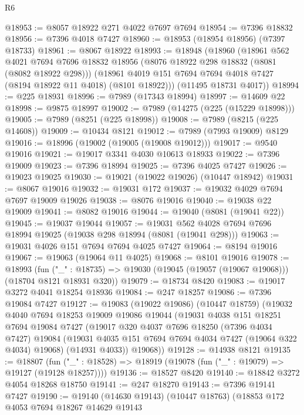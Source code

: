 \begin{lexlean}{R6}
\begin{coremodule}
@18953 := @8057 @18922 @271 @4022 @7697 @7694
@18954 := @7396 @18832
@18956 := @7396 @4018 @7427
@18960 := @18953 (@18954 @18956) (@7397 @18733)
@18961 := @8067 @18922
@18993 := @18948
    (@18960
      (@18961
        @562
        @4021
        @7694
        @7696
        @18832
        @18956
        (@8076 @18922 @298 @18832 (@8081 (@8082 @18922 @298)))
        (@18961 @4019 @151 @7694 @7694 @4018 @7427 (@8194 @18922 @11 @4018) (@8101 @18922)))
      (@11495 @18731 @4017))
@18994 := @225 @18931
@18996 := @7989 (@17343 @18994)
@18997 := @14609 @22
@18998 := @9875 @18997
@19002 := @7989 (@14275 (@225 (@15229 @18998)))
@19005 := @7989 (@8251 (@225 @18998))
@19008 := @7989 (@8215 (@225 @14608))
@19009 := @10434 @8121
@19012 := @7989 (@7993 @19009) @8129
@19016 := @18996 (@19002 (@19005 (@19008 @19012)))
@19017 := @9540 @19016
@19021 := @19017 @3341 @4030 @10613 @18933
@19022 := @7396 @19009
@19023 := @7396 @18994
@19025 := @7396 @4025 @7427
@19026 := @19023 @19025
@19030 := @19021 (@19022 @19026) (@10447 @18942)
@19031 := @8067 @19016
@19032 := @19031 @172
@19037 := @19032 @4029 @7694 @7697 @19009 @19026
@19038 := @8076 @19016
@19040 := @19038 @22 @19009
@19041 := @8082 @19016
@19044 := @19040 (@8081 (@19041 @22))
@19045 := @19037 @19044
@19057 := @19031 @562 @4028 @7694 @7696 @18994 @19025 (@19038 @298 @18994 (@8081 (@19041 @298)))
@19063 := @19031 @4026 @151 @7694 @7694 @4025 @7427
@19064 := @8194 @19016
@19067 := @19063 (@19064 @11 @4025)
@19068 := @8101 @19016
@19078 := @18993
    (fun ("_" : @18735) => @19030 (@19045 (@19057 (@19067 @19068))) (@18704 @8121 @18931 @320))
@19079 := @18734 @8420
@19083 := @19017 @3272 @4041 @18254 @18936
@19084 := @247 @18257
@19086 := @7396 @19084 @7427
@19127 := @19083
    (@19022 @19086)
    (@10447 @18759)
    (@19032
      @4040
      @7694
      @18253
      @19009
      @19086
      @19044
      (@19031
        @4038
        @151
        @18251
        @7694
        @19084
        @7427
        (@19017
          @320
          @4037
          @7696
          @18250
          (@7396 @4034 @7427)
          @19084
          (@19031 @4035 @151 @7694 @7694 @4034 @7427 (@19064 @322 @4034) @19068)
          (@14931 @4033))
        @19068))
@19128 := @14938 @8121
@19135 := @18807
    (fun ("_" : @18528) => @18919 (@19078 (fun ("_" : @19079) => @19127 (@19128 @18257))))
@19136 := @18527 @8420
@19140 := @18842 @3272 @4054 @18268 @18750
@19141 := @247 @18270
@19143 := @7396 @19141 @7427
@19190 := @19140
    (@14630 @19143)
    (@10447 @18763)
    (@18853
      @172
      @4053
      @7694
      @18267
      @14629
      @19143

\end{coremodule}
\end{lexlean}
